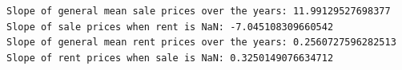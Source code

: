 \documentclass[11pt]{article}
\makeatletter
\newcommand{\boxspacing}{\kern\kvtcb@left@rule\kern\kvtcb@boxsep}
\newcommand{\prompt}[4]{
        {\ttfamily\llap{{\color{#2}[#3]:\hspace{3pt}#4}}\vspace{-\baselineskip}}
    }
\makeatother
\begin{document}
    \begin{Verbatim}[commandchars=\\\{\}]
Slope of general mean sale prices over the years: 11.99129527698377
Slope of sale prices when rent is NaN: -7.045108309660542
Slope of general mean rent prices over the years: 0.2560727596282513
Slope of rent prices when sale is NaN: 0.3250149076634712
    \end{Verbatim}

    \begin{tcolorbox}[breakable, size=fbox, boxrule=1pt, pad at break*=1mm,colback=cellbackground, colframe=cellborder]
\prompt{In}{incolor}{ }{\boxspacing}
\begin{Verbatim}[commandchars=\\\{\}]

\end{Verbatim}
\end{tcolorbox}


    
    
    
\end{document}
